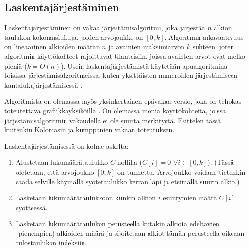\documentclass[a4paper,11pt]{article}
\begin{document}
\subsection{Laskentajärjestäminen}

Laskentajärjestäminen on vakaa järjestämisalgoritmi, joka järjestää $n$ alkion taulukon kokonaislukuja, joiden arvojoukko on $[0, k]$. Algoritmin aikavaativuus on lineaarinen alkioiden määrän $n$ ja avainten maksimiarvon $k$ suhteen, joten algoritmin käyttökohteet rajoittuvat tilanteisiin, joissa avainten arvot ovat melko pieniä ($k = O(n)$). Usein laskentajärjestämistä käytetään apualgoritmina toisissa järjestämisalgoritmeissa, kuten yksittäisten numeroiden järjestämiseen kantalukujärjestämisessä \cite{clrs}.

Algoritmista on olemassa myös yksinkertainen epävakaa versio, joka on tehokas toteutettava grafiikkayksiköillä \cite{sun2009}. On olemassa monia käyttökohteita, joissa järjestämisalgoritmin vakaudella ei ole suurta merkitystä. Esittelen tässä kuitenkin Koloniasin ja kumppanien \cite{kolonias2011} vakaan toteutuksen.

Laskentajärjestämisessä on kolme askelta:

\begin{enumerate}
\item Alustetaan lukumäärätaulukko $C$ nollilla ($C[i] = 0$ $\forall i \in [0, k]$). (Tässä oletetaan, että arvojoukko $[0, k]$ on tunnettu. Arvojoukko voidaan tietenkin saada selville käymällä syötetaulukko kerran läpi ja etsimällä suurin alkio.)
\item Lasketaan lukumäärätaulukkoon kunkin alkion $i$ esiintymien määrä $C[i]$ syötteessä.
\item Lasketaan lukumäärätaulukon perusteella kutakin alkiota edeltävien (pienempien) alkioiden määrä ja sijoitetaan alkiot tämän perusteella oikeaan tulostaulukon indeksiin.
\end{enumerate}

%
%
%
%
\end{document}
